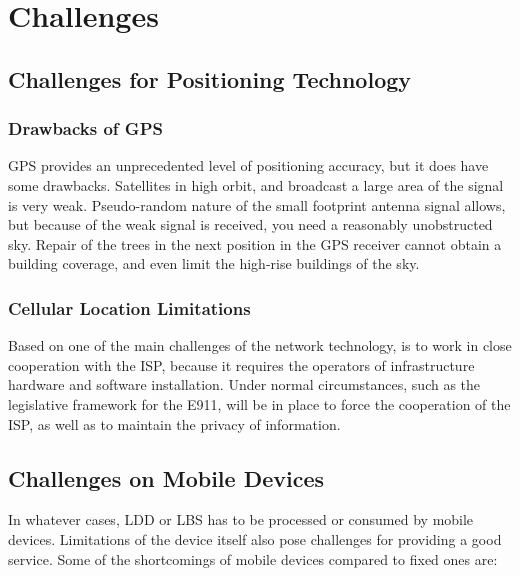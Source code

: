 \documentclass[12pt,a4paper]{article}
\begin{document}
\section{Challenges} %
\label{sec:challenges}

\subsection{Challenges for Positioning Technology} %
\label{sub:challenges_for_positioning_technology}

\subsubsection{Drawbacks of GPS} %
\label{ssub:drawbacks_of_gps}
GPS provides an unprecedented level of positioning accuracy, but it does have some drawbacks. Satellites in high orbit, and broadcast a large area of ​​the signal is very weak. Pseudo-random nature of the small footprint antenna signal allows, but because of the weak signal is received, you need a reasonably unobstructed sky. Repair of the trees in the next position in the GPS receiver cannot obtain a building coverage, and even limit the high-rise buildings of the sky. \cite{DRoza:2003wz}

\subsubsection{Cellular Location Limitations} %
\label{ssub:cellular_location_limitations}
Based on one of the main challenges of the network technology, is to work in close cooperation with the ISP, because it requires the operators of infrastructure hardware and software installation. Under normal circumstances, such as the legislative framework for the E911, will be in place to force the cooperation of the ISP, as well as to maintain the privacy of information. \cite{wiki-cellloc}


\subsection{Challenges on Mobile Devices} %
\label{sub:challenges_on_mobile_devices}
In whatever cases, LDD or LBS has to be processed or consumed by mobile devices. Limitations of the device itself also pose challenges for providing a good service. Some of the shortcomings of mobile devices compared to fixed ones are:
\end{document}
